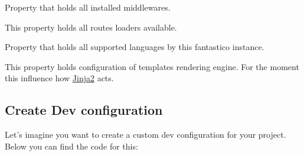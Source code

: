 \documentclass[letterpaper,10pt,english]{sphinxmanual}
\begin{document}
\begin{fulllineitems}
\begin{fulllineitems}
\end{fulllineitems}


\begin{fulllineitems}
\label{get_started/settings:fantastico.settings.BasicSettings.installed_middleware}
Property that holds all installed middlewares.

\end{fulllineitems}


\begin{fulllineitems}
\label{get_started/settings:fantastico.settings.BasicSettings.routes_loaders}
This property holds all routes loaders available.

\end{fulllineitems}


\begin{fulllineitems}
\label{get_started/settings:fantastico.settings.BasicSettings.supported_languages}
Property that holds all supported languages by this fantastico instance.

\end{fulllineitems}


\begin{fulllineitems}
\label{get_started/settings:fantastico.settings.BasicSettings.templates_config}
This property holds configuration of templates rendering engine. For the moment this influence how 
\href{http://jinja.pocoo.org/docs/}{Jinja2} acts.

\end{fulllineitems}


\end{fulllineitems}



\subsection{Create Dev configuration}
\label{get_started/settings:create-dev-configuration}
Let's imagine you want to create a custom dev configuration for your project. Below you can find the code for this:
\end{document}
